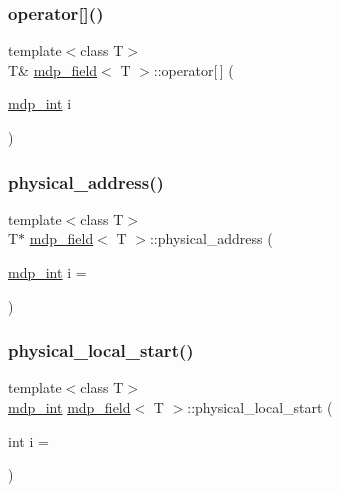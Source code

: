 \subsubsection{\texorpdfstring{operator[]()}{operator[]()}\hspace{0.1cm}{\footnotesize\ttfamily [2/2]}}
{\footnotesize\ttfamily template$<$class T$>$ \\
T\& \hyperlink{classmdp__field}{mdp\+\_\+field}$<$ T $>$\+::operator\mbox{[}$\,$\mbox{]} (\begin{DoxyParamCaption}\item[{\hyperlink{mdp__global__vars_8h_aaa1ad9d0dcd2124aa5af0120d9954174}{mdp\+\_\+int}}]{i }\end{DoxyParamCaption})\hspace{0.3cm}{\ttfamily [inline]}}

\mbox{\label{classmdp__field_a345bb93496b3154b4349878d02ab0a2a}} 
\subsubsection{\texorpdfstring{physical\+\_\+address()}{physical\_address()}}
{\footnotesize\ttfamily template$<$class T$>$ \\
T$\ast$ \hyperlink{classmdp__field}{mdp\+\_\+field}$<$ T $>$\+::physical\+\_\+address (\begin{DoxyParamCaption}\item[{\hyperlink{mdp__global__vars_8h_aaa1ad9d0dcd2124aa5af0120d9954174}{mdp\+\_\+int}}]{i = {} }\end{DoxyParamCaption})\hspace{0.3cm}{\ttfamily [inline]}}

\mbox{\label{classmdp__field_a58b111a6f42e6b3807c6e333fc080020}} 
\subsubsection{\texorpdfstring{physical\+\_\+local\+\_\+start()}{physical\_local\_start()}}
{\footnotesize\ttfamily template$<$class T$>$ \\
\hyperlink{mdp__global__vars_8h_aaa1ad9d0dcd2124aa5af0120d9954174}{mdp\+\_\+int} \hyperlink{classmdp__field}{mdp\+\_\+field}$<$ T $>$\+::physical\+\_\+local\+\_\+start (\begin{DoxyParamCaption}\item[{int}]{i = {} }\end{DoxyParamCaption})\hspace{0.3cm}{\ttfamily [inline]}}

